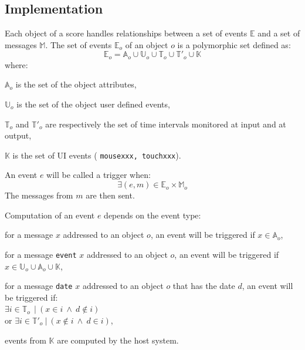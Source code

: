\documentclass{article}
\newcommand{\OSC}[1]	{{\fontsize{8.5pt}{8pt} \selectfont\texttt{#1}}}
\let\olditemize\itemize
\let\oldenditemize\enditemize
\renewenvironment{itemize} 	{\olditemize \renewcommand{\labelitemi}{$\bullet$} \setlength{\itemsep}{0mm}}{\oldenditemize}
\begin{document}
\subsection{Implementation}

Each object of a score handles relationships between a set of events $\mathbb{E}$ and a set of messages $\mathbb{M}$. The set of events $\mathbb{E}_o$ of an object $o$ is a polymorphic set defined as:
\[
	\mathbb{E}_o = \mathbb{A}_o \cup \mathbb{U}_o \cup \mathbb{T}_o \cup \mathbb{T'}_o \cup \mathbb{K}  
\] 
where:
\begin{itemize}
\item[-] $\mathbb{A}_o$ is the set of the object attributes, 
\item[-] $\mathbb{U}_o$ is the set of the object user defined events, 
\item[-] $\mathbb{T}_o$ and $\mathbb{T'}_o$ are respectively the set of time intervals monitored at input and at output,
\item[-] $\mathbb{K}$ is the set of UI events (\OSC{mousexxx, touchxxx}).
\end{itemize}

An event $e$ will be called a trigger when:
\[
	\exists (e, m) \in \mathbb{E}_o \times \mathbb{M}_o  
\] 
The messages from $m$ are then sent.

Computation of an event $e$ depends on the event type:
\begin{itemize}
\item[-] for a message $x$ addressed to an object $o$, an event will be triggered if $x \in \mathbb{A}_o$, 
\item[-] for a message \OSC{event} $x$ addressed to an object $o$, an event will be triggered if $x \in \mathbb{U}_o \cup \mathbb{A}_o \cup  \mathbb{K}$,
\item[-] for a message \OSC{date} $x$ addressed to an object $o$ that has the date $d$, an event will be triggered if:\\ 
\hspace*{3.5mm} $\exists i \in \mathbb{T}_o\ \ |\ (x \in i\ \land\ d \not\in i)$ \\
or $\exists i \in \mathbb{T'}_o\ |\ (x \not \in i\ \land\ d \in i)$,
\item[-] events from $\mathbb{K}$ are computed by the host system.
\end{itemize}

\end{document}
